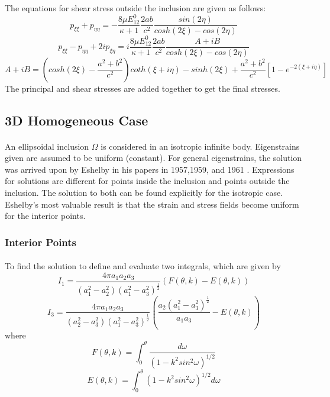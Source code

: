 \documentclass[12pt, a4paper]{report}
\begin{document}
The equations for shear stress outside the inclusion are given as follows:
\begin{equation}
    p_{\xi\xi} + p_{\eta\eta} = -\frac{8\mu E^0_{12}}{\kappa + 1} \frac{2ab}{c^2} \frac{sin (2\eta)}{cosh (2\xi) - cos (2\eta)}
\end{equation}
\begin{equation}
    p_{\xi\xi} - p_{\eta\eta} + 2ip_{\xi\eta} = i\frac{8\mu E^0_{12}}{\kappa + 1} \frac{2ab}{c^2} \frac{A + iB}{cosh (2\xi) - cos (2\eta)}
\end{equation}
\begin{equation}
    A + iB = \left(cosh(2\xi) - \frac{a^2 + b^2}{c^2}\right)coth(\xi + i\eta)   - sinh(2\xi) + \frac{a^2 + b^2}{c^2} [1-e^{-2(\xi + i\eta)}]
\end{equation}
The principal and shear stresses are added together to get the final stresses.

\subsection{3D Homogeneous Case}
\paragraph{}
An ellipsoidal inclusion $\Omega$ is considered in an isotropic infinite body. Eigenstrains given are assumed to be uniform (constant). For general eigenstrains, the solution was arrived upon by Eshelby in his papers in 1957,1959, and 1961 \cite{mura1987micromechanics}. Expressions for solutions are different for points inside the inclusion and points outside the inclusion. The solution to both can be found explicitly for the isotropic case. Eshelby's most valuable result is that the strain and stress fields become uniform for the interior points.

\subsubsection{Interior Points}
\paragraph{}
To find the solution to define and evaluate two integrals, which are given by
\begin{equation}
    I_{1} = \frac{4\pi a_1 a_2 a_3}{(a_{1}^{2} - a_{2}^{2})(a_{1}^{2} - a_{3}^{2})^{\frac{1}{2}}} \left(F(\theta, k) - E(\theta,k)\right)
\end{equation}
\begin{equation}
    I_{3} = \frac{4\pi a_1 a_2 a_3}{(a_{2}^{2} - a_{3}^{2})(a_{1}^{2} - a_{3}^{2})^{\frac{1}{2}}} \left(\frac{a_2 (a_{1}^{2} - a_{3}^{2})^{\frac{1}{2}}}{a_1 a_3} - E(\theta,k)\right)
\end{equation}
where
\begin{equation}
    F(\theta, k) = \int_{0}^{\theta} \frac{d\omega}{(1 - k^2 sin^2 \omega)^{1/2}}
    \label{Felliptic}
\end{equation}
\begin{equation}
    E(\theta, k) = \int_{0}^{\theta} (1 - k^2 sin^2 \omega)^{1/2} d\omega
    \label{Eelliptic}
\end{equation}
\end{document}
